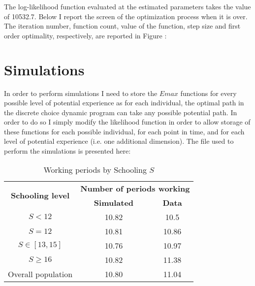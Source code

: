 \documentclass[11pt]{article}
\begin{document}
The log-likelihood function evaluated at the estimated parameters takes the value of 10532.7. Below I report the screen of the optimization process when it is over. The iteration number, function count, value of the function, step size and first order optimality, respectively, are reported in Figure :




\section{Simulations}

In order to perform simulations I need to store the $Emax$ functions for every possible level of potential experience as for each individual, the optimal path in the discrete choice dynamic program can take any possible potential path. In order to do so I simply modify the likelihood function in order to allow storage of these functions for each possible individual, for each point in time, and for each level of potential experience (i.e. one additional dimension). The file used to perform the simulations is presented here:




\begin{table}[H]
  \centering
  \caption{Working periods by Schooling $S$}
    \begin{tabular}{|c||c|c|}
    \hline
    \multirow{2}{*}{\textbf{Schooling level}} & \multicolumn{2}{c}{\textbf{Number of periods working}} \\
   
          & \textbf{Simulated} & \textbf{Data} \\
          \hline
    \textbf{$S<12$} & 10.82  & 10.5 \\
    \textbf{$S=12$} & 10.81  & 10.86 \\
    \textbf{$S \in [13, 15]$} & 10.76  & 10.97 \\
    \textbf{$S \geq16$} & 10.82  & 11.38 \\
    Overall population & 10.80  & 11.04 \\
    \hline
    \end{tabular}%
  \label{tab:addlabel}%
\end{table}%
\end{document}
